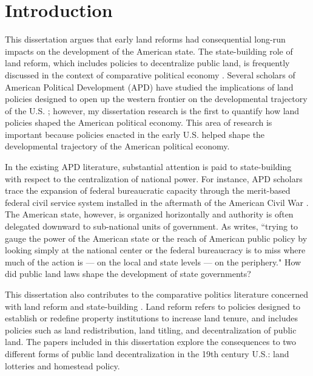 \chapter{Introduction}

This dissertation argues that early land reforms had consequential long-run impacts on the development of the American state. The state-building role of land reform, which includes policies to decentralize public land, is frequently discussed in the context of comparative political economy \citep[e.g.,][]{albertus2015autocracy,murtazashvili2016does}. Several scholars of American Political Development (APD) have studied the implications of land policies designed to open up the western frontier on the developmental trajectory of the U.S. \citep[e.g.,][]{bensel1990,frymer2014rush}; however, my dissertation research is the first to quantify how land policies shaped the American political economy. This area of research is important because policies enacted in the early U.S. helped shape the developmental trajectory of the American political economy.

In the existing APD literature, substantial attention is paid to state-building with respect to the centralization of national power.  For instance, APD scholars trace the expansion of federal bureaucratic capacity through the merit-based federal civil service system installed in the aftermath of the American Civil War \citep{skowronek1982building,bensel1990,carpenter2001}. The American state, however, is organized horizontally and authority is often delegated downward to sub-national units of government. As \citet{novak2008myth} writes, ``trying to gauge the power of the American state or the reach of American public policy by looking simply at the national center or the federal bureaucracy is to miss where much of the action is --- on the local and state levels --- on the periphery." How did public land laws shape the development of state governments?

This dissertation also contributes to the comparative politics literature concerned with land reform and state-building  \citep[e.g.,][]{albertus2015autocracy, murtazashvili2016does}. Land reform refers to policies designed to establish or redefine property institutions to increase land tenure, and includes policies such as land redistribution, land titling, and decentralization of public land. The papers included in this dissertation explore the consequences to two different forms of public land decentralization in the 19th century U.S.: land lotteries and homestead policy.

